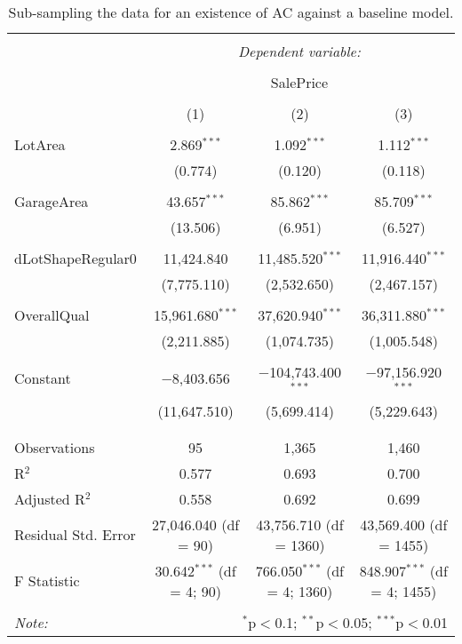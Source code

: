 \documentclass{article}
\begin{document}
\begin{table}[h]
\centering
\caption{\label{tab:acunits} Sub-sampling the data for an existence of AC against a baseline model.}
\begin{tabular}{@{\extracolsep{5pt}}lccc} 
\\[-1.8ex]\hline 
\hline \\[-1.8ex] 
 & \multicolumn{3}{c}{\textit{Dependent variable:}} \\ 
\cline{2-4} 
\\[-1.8ex] & \multicolumn{3}{c}{SalePrice} \\ 
\\[-1.8ex] & (1) & (2) & (3)\\ 
\hline \\[-1.8ex] 
 LotArea & 2.869$^{***}$ & 1.092$^{***}$ & 1.112$^{***}$ \\ 
  & (0.774) & (0.120) & (0.118) \\ 
  & & & \\ 
 GarageArea & 43.657$^{***}$ & 85.862$^{***}$ & 85.709$^{***}$ \\ 
  & (13.506) & (6.951) & (6.527) \\ 
  & & & \\ 
 dLotShapeRegular0 & 11,424.840 & 11,485.520$^{***}$ & 11,916.440$^{***}$ \\ 
  & (7,775.110) & (2,532.650) & (2,467.157) \\ 
  & & & \\ 
 OverallQual & 15,961.680$^{***}$ & 37,620.940$^{***}$ & 36,311.880$^{***}$ \\ 
  & (2,211.885) & (1,074.735) & (1,005.548) \\ 
  & & & \\ 
 Constant & $-$8,403.656 & $-$104,743.400$^{***}$ & $-$97,156.920$^{***}$ \\ 
  & (11,647.510) & (5,699.414) & (5,229.643) \\ 
  & & & \\ 
\hline \\[-1.8ex] 
Observations & 95 & 1,365 & 1,460 \\ 
R$^{2}$ & 0.577 & 0.693 & 0.700 \\ 
Adjusted R$^{2}$ & 0.558 & 0.692 & 0.699 \\ 
Residual Std. Error & 27,046.040 (df = 90) & 43,756.710 (df = 1360) & 43,569.400 (df = 1455) \\ 
F Statistic & 30.642$^{***}$ (df = 4; 90) & 766.050$^{***}$ (df = 4; 1360) & 848.907$^{***}$ (df = 4; 1455) \\ 
\hline 
\hline \\[-1.8ex] 
\textit{Note:}  & \multicolumn{3}{r}{$^{*}$p$<$0.1; $^{**}$p$<$0.05; $^{***}$p$<$0.01} \\ 
\end{tabular} 
\end{table} 
\end{document}
